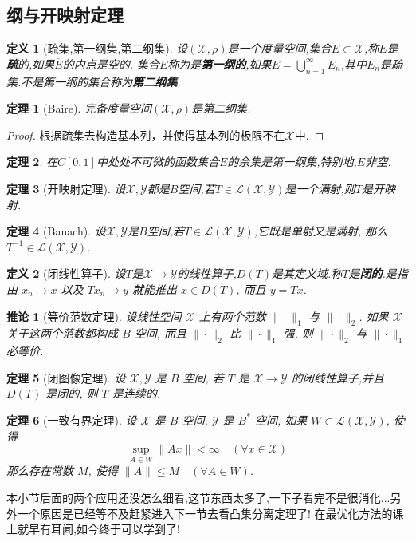 \documentclass[12pt,a4paper]{article}
\newtheorem{thm}{定理}[subsection]  %
\newtheorem{corollary}{推论}[subsection] %
\newtheorem{definition}{定义}[subsection] %
\begin{document}
\subsection{纲与开映射定理}
\begin{definition}[疏集,第一纲集,第二纲集]
    设$(\mathscr{X},\rho )$是一个度量空间,集合$E \subset \mathscr{X}$,称$E$是\textbf{疏}的,如果$\overline{E}$的内点是空的.
    集合$E$称为是\textbf{第一纲的},如果$E = \bigcup_{n=1}^\infty E_n$,其中$E_n$是疏集.不是第一纲的集合称为\textbf{第二纲集}.
\end{definition}
\begin{thm}[Baire]
    完备度量空间$(\mathscr{X}, \rho)$是第二纲集.
\end{thm}
\begin{proof}
    根据疏集去构造基本列，并使得基本列的极限不在$\mathscr{X}$中.
\end{proof}
\begin{thm}
    在$C[0,1]$中处处不可微的函数集合$E$的余集是第一纲集,特别地,$E$非空.
\end{thm}
\begin{thm}[开映射定理]
    设$\mathscr{X},\mathscr{Y}$都是$B$空间,若$T \in \mathscr{L}(\mathscr{X},\mathscr{Y})$是一个满射,则$T$是开映射.
\end{thm}
\begin{thm}[Banach]
    设$\mathscr{X},\mathscr{Y}$是$B$空间,若$T \in \mathscr{L}(\mathscr{X}, \mathscr{Y})$,它既是单射又是满射,
    那么$T^{-1} \in \mathscr{L}(\mathscr{X}, \mathscr{Y})$.
\end{thm}
\begin{definition}[闭线性算子]
    设$T$是$\mathscr{X} \to \mathscr{Y}$的线性算子,$D(T)$是其定义域.称$T$是\textbf{闭的}.是指由 $x_n \to x$ 以及 $Tx_n \to y$ 就能推出 $x \in D(T)$, 而且 $y = Tx$.
\end{definition}
\begin{corollary}[等价范数定理]
    设线性空间 $\mathscr{X}$ 上有两个范数 $\|\cdot\|_1$ 与 $\|\cdot\|_2$. 如果 $\mathscr{X}$ 关于这两个范数都构成 $B$ 空间, 
    而且 $\|\cdot\|_2$ 比 $\|\cdot\|_1$ 强, 则 $\|\cdot\|_2$ 与 $\|\cdot\|_1$ 必等价.
\end{corollary}
\begin{thm}[闭图像定理]
    设 $\mathscr{X}, \mathscr{Y}$ 是 $B$ 空间, 若 $T$ 是 $\mathscr{X} \to \mathscr{Y}$ 的闭线性算子,并且 $D(T)$ 是闭的, 则 $T$ 是连续的.
\end{thm}
\begin{thm}[一致有界定理]
    设 $\mathscr{X}$ 是 $B$ 空间, $\mathscr{Y}$ 是 $B^*$ 空间, 如果 $W \subset \mathscr{L}(\mathscr{X}, \mathscr{Y})$, 使得
    \[\underset{A \in W}{\sup} \|Ax\| < \infty \quad (\forall x \in \mathscr{X})\]
    那么存在常数 $M$, 使得 $\|A\| \leq M \quad (\forall A \in W)$.
\end{thm}
本小节后面的两个应用还没怎么细看,这节东西太多了,一下子看完不是很消化...另外一个原因是已经等不及赶紧进入下一节去看凸集分离定理了!
在最优化方法的课上就早有耳闻,如今终于可以学到了!
\end{document}
